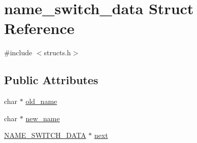 \hypertarget{structname__switch__data}{\section{name\-\_\-switch\-\_\-data Struct Reference}
\label{structname__switch__data}
}


{\ttfamily \#include $<$structs.\-h$>$}

\subsection*{Public Attributes}
\begin{DoxyCompactItemize}
\item 
char $\ast$ \hyperlink{structname__switch__data_a23123960270351da2e88086084782da9}{old\-\_\-name}
\item 
char $\ast$ \hyperlink{structname__switch__data_a1678ec4303dcc6a0b0b1a23ba293cd53}{new\-\_\-name}
\item 
\hyperlink{structs_8h_a2621572337e2557c60a36d55d8283a0a}{N\-A\-M\-E\-\_\-\-S\-W\-I\-T\-C\-H\-\_\-\-D\-A\-T\-A} $\ast$ \hyperlink{structname__switch__data_aa89d7ff142ccd97fa9a68532f7d495fe}{next}
\end{DoxyCompactItemize}


